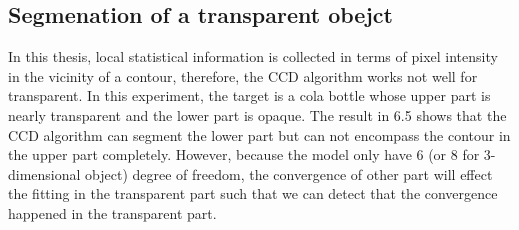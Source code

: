 \subsection{Segmenation of a transparent obejct}
\label{sec:sto}
In this thesis, local statistical information is collected in terms of
pixel intensity in the vicinity of a contour, therefore, the CCD
algorithm works not well for transparent. In this experiment, the
target is a cola bottle whose upper part is nearly transparent and the
lower part is opaque. The result in 6.5 shows that the CCD algorithm
can segment the lower part but can not encompass the contour in the
upper part completely. However, because the model only have 6 (or 8
for 3-dimensional object) degree of freedom, the convergence of other
part will effect the fitting in the transparent part such that we can
detect that the convergence happened in the transparent part.


